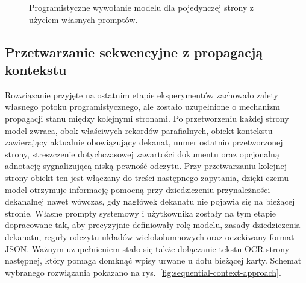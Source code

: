 \begin{figure}[htbp]
\centering
{}
\caption{Programistyczne wywołanie modelu dla pojedynczej strony z użyciem własnych promptów.}
\label{fig:custom-page-approach}
\end{figure}

\subsection{Przetwarzanie sekwencyjne z propagacją kontekstu}\label{subsec:sekwencyjne_z_kontekstem}

Rozwiązanie przyjęte na ostatnim etapie eksperymentów zachowało zalety własnego potoku programistycznego, ale zostało uzupełnione o mechanizm propagacji stanu między kolejnymi stronami.
Po przetworzeniu każdej strony model zwraca, obok właściwych rekordów parafialnych, obiekt kontekstu zawierający aktualnie obowiązujący dekanat, numer ostatnio przetworzonej strony, streszczenie dotychczasowej zawartości dokumentu oraz opcjonalną adnotację sygnalizującą niską pewność odczytu.
Przy przetwarzaniu kolejnej strony obiekt ten jest włączany do treści następnego zapytania, dzięki czemu model otrzymuje informację pomocną przy dziedziczeniu przynależności dekanalnej nawet wówczas, gdy nagłówek dekanatu nie pojawia się na bieżącej stronie.
Własne prompty systemowy i użytkownika zostały na tym etapie dopracowane tak, aby precyzyjnie definiowały rolę modelu, zasady dziedziczenia dekanatu, reguły odczytu układów wielokolumnowych oraz oczekiwany format JSON.
Ważnym uzupełnieniem stało się także dołączanie tekstu OCR strony następnej, który pomaga domknąć wpisy urwane u dołu bieżącej karty.
Schemat wybranego rozwiązania pokazano na rys.~\ref{fig:sequential-context-approach}.

